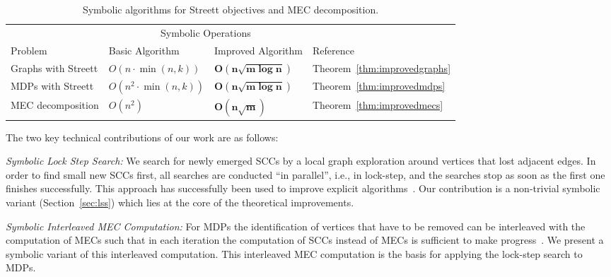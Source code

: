 \vspace{-1mm}
\begin{table}
\renewcommand{\arraystretch}{1.3}
\caption{Symbolic algorithms for Streett objectives and MEC decomposition.}\label{tab:symb:comparison}
\vspace{0.5mm}
\centering
\begin{tabular}{@{}llll@{}}
\toprule
& \multicolumn{2}{c}{Symbolic Operations}\\
\cmidrule{2-4}
Problem & Basic Algorithm & Improved Algorithm & Reference \\
\midrule
Graphs with Streett  & $O(n \cdot \min(n, k))$ & \boldmath$\mathbf{O(n \sqrt{m \log n})}$ & Theorem~\ref{thm:improvedgraphs}\\
MDPs with Streett  & $O(n^2 \cdot \min(n, k))$ & \boldmath$\mathbf{O(n \sqrt{m \log n})}$ & Theorem~\ref{thm:improvedmdps} \\
MEC decomposition & $O(n^2)$ & \boldmath$\mathbf{O(n \sqrt{m})}$ & Theorem~\ref{thm:improvedmecs} \\
\bottomrule
\end{tabular}
\end{table}
\setlength\intextsep{0em}
\smallskip

\vspace{-0.5mm}
\smallskip{}
The two key technical contributions of our work are as follows:
\begin{compactitem}
\item \emph{Symbolic Lock Step Search:} We search for newly emerged SCCs by a 
local graph exploration around vertices that lost adjacent edges. 
In order to find small new SCCs first, all searches are conducted ``in parallel'', i.e., in lock-step, 
and the searches stop as soon as the first one finishes successfully. 
This approach has successfully been used to improve explicit algorithms~\cite{HenzingerT96,ChatterjeeJH03,ChatterjeeH12,ChatterjeeDHL16}.
Our contribution is a non-trivial symbolic variant (Section~\ref{sec:lss}) 
which lies at the core of the theoretical improvements.

\item \emph{Symbolic Interleaved MEC Computation:}
For MDPs the identification of vertices that have to be removed can be interleaved with the computation of MECs such that in each iteration the computation of SCCs instead of MECs is sufficient to 
make progress~\cite{ChatterjeeDHL16}. We present a symbolic variant of this interleaved computation. 
This interleaved MEC computation is the basis for applying the lock-step search to MDPs.
\end{compactitem}
